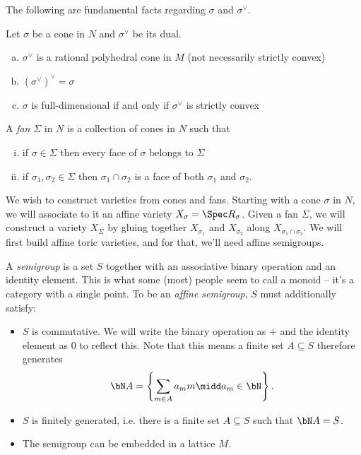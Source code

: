 The following are fundamental facts regarding $\sigma$ and $\sigma^{\vee}$.
\begin{prop}\label{prop:facts-about-cones-and-duals}
	Let $\sigma$ be a cone in $N$ and $\sigma^{\vee}$ be its dual.
	\begin{enumerate}[(a)]
		\item $\sigma^{\vee}$ is a rational polyhedral cone in $M$ (not necessarily strictly convex)
		\item $(\sigma^{\vee})^{\vee} = \sigma$
		\item $\sigma$ is full-dimensional if and only if $\sigma^{\vee}$ is strictly convex
	\end{enumerate}
\end{prop}
\begin{defn}\label{defn:fan}
	A \emph{fan} $\Sigma$ in $N$ is a collection of cones in $N$ such that
	\begin{enumerate}[(i)]
		\item if $\sigma \in \Sigma$ then every face of $\sigma$ belongs to $\Sigma$ 
		\item if $\sigma_1,\sigma_2\in \Sigma$ then $\sigma_1\cap \sigma_2$ is a face of both $\sigma_1$ and $\sigma_2$.
	\end{enumerate}
\end{defn}
We wish to construct varieties from cones and fans. Starting with a cone $\sigma$ in $N$, we will associate to it an affine variety $X_\sigma = \Spec R_\sigma$. Given a fan $\Sigma$, we will construct a variety $X_\Sigma$ by gluing together $X_{\sigma_1}$ and $X_{\sigma_2}$ along $X_{\sigma_1 \cap \sigma_2}$. We will first build affine toric varieties, and for that, we'll need affine semigroups.

\begin{defn}\label{defn:affine-semigroup}
	A \emph{semigroup} is a set $S$ together with an associative binary operation and an identity element. This is what some (most) people seem to call a monoid -- it's a category with a single point. To be an \emph{affine semigroup}, $S$ must additionally satisfy:
	\begin{itemize}
		\item $S$ is commutative. We will write the binary operation as $+$ and the identity element as  $0$ to reflect this. Note that this means a finite set $A \subseteq S$ therefore generates
			\begin{align*}
				\bN A = \left\{\sum_{m\in A} a_m m \midd a_m \in \bN\right\}.
			\end{align*}
		\item  $S$ is finitely generated, i.e. there is a finite set $A \subseteq S$ such that $\bN A = S$. 
		\item The semigroup can be embedded in a lattice $M$.
	\end{itemize}
\end{defn}

